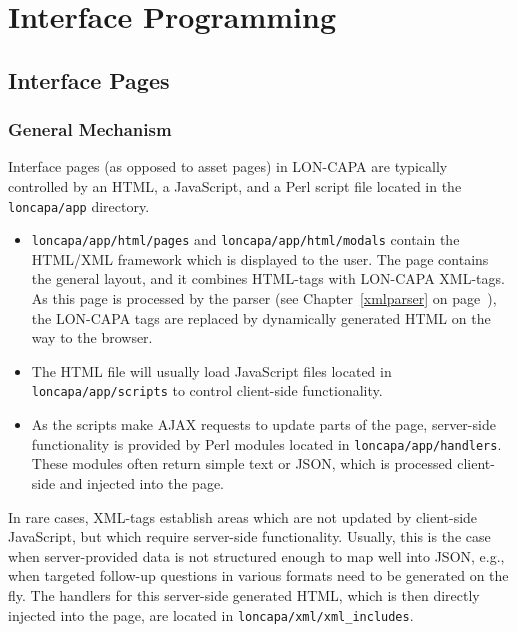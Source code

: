 
\chapter{Interface Programming}
\label{interfaceprogramming}
\section{Interface Pages}


\subsection{General Mechanism}
Interface pages (as opposed to asset pages) in LON-CAPA are typically controlled by an HTML, a JavaScript, and a Perl script file located in the {\tt loncapa/app} directory.
\begin{itemize}
\item  {\tt loncapa/app/html/pages} and {\tt loncapa/app/html/modals} contain the HTML/XML framework which is displayed to the user. The page contains the general layout, and it combines HTML-tags with LON-CAPA XML-tags. As this
page is processed by the parser (see Chapter~\ref{xmlparser} on page~\pageref{xmlparser}), the LON-CAPA tags are replaced by dynamically generated HTML on the way to the browser.
\item The HTML file will usually load JavaScript files located in {\tt loncapa/app/scripts} to control client-side functionality.
\item As the scripts make AJAX requests to update parts of the page, server-side functionality is provided by Perl modules located in {\tt loncapa/app/handlers}. These modules often return simple text or JSON, which is processed client-side and injected into the page.
\end{itemize}
In rare cases, XML-tags establish areas which are not updated by client-side JavaScript, but which require server-side functionality. Usually, this is the case when server-provided data is not
structured enough to map well into JSON, e.g., when targeted follow-up questions in various formats need to be generated on the fly. The handlers for this server-side generated HTML, which is then
directly injected into the page, are located in {\tt loncapa/xml/xml\_includes}.



